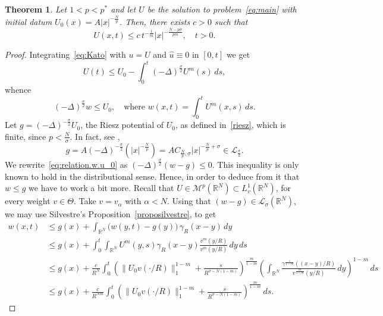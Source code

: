 \documentclass[leqno,12pt]{amsart}
\newtheorem{theorem}{Theorem}[section]
\theoremstyle{definition}
\theoremstyle{remark}
\numberwithin{equation}{section}
\begin{document}
\begin{theorem}\label{thm global bound}
    Let $1<p<p^*$ and let $U$ be the solution to problem~\eqref{eq:main} with initial datum $U_0(x)=A|x|^{-\frac Np}$. Then, there exists $c>0$ such that
    \begin{equation}\label{U:estimate}
        U(x,t)\le c\,t^{-\frac 1 m}|x|^{-\frac{N-p\sigma}{pm}},\quad t>0.
    \end{equation}
\end{theorem}

\begin{proof}
Integrating~\eqref{eq:Kato} with $u=U$ and $\hat u\equiv0$ in $[0,t]$ we get 
\[
    U(t)\le U_0-\int_0^t (-\Delta)^{\frac\sigma2}U^m(s)\,ds,
\]
whence
\begin{equation}\label{eq:relation.w.u_0}
    (-\Delta)^{\frac\sigma2}w\leq U_0,\quad \text{where }w(x,t)=\int_{0}^{t}U^{m}(x,s)\,ds.
\end{equation}
Let $g=(-\Delta)^{-\frac\sigma2}U_0$, the Riesz potential of $U_0$, as defined in~\eqref{riesz}, which is finite, since $p<\frac{N}{\sigma}$. In fact,
see \cite{lieb-loss},
\begin{equation}\label{rieszradial}
    g=A(-\Delta)^{-\frac{\sigma}{2}}\left(|x|^{-\frac{N}{p}}\right)=AC_{\frac{N}{p},\sigma}|x|^{-\frac{N}{p}+\sigma}\in \mathcal{L}_{\frac\sigma2}.
\end{equation} 
We rewrite~\eqref{eq:relation.w.u_0} as  $(-\Delta)^{\frac\sigma2}(w-g)\leq 0$. This inequality is only known to hold in the distributional sense. Hence, in order to deduce from it that $w\le g$ we have to work a bit more. Recall that $U\in \mathcal{M}^p(\mathbb{R}^N)\subset L_v^1(\mathbb{R}^N)$, for every weight $v\in\Theta$. Take $v=v_\alpha$ with $\alpha<N$. 
Using that $(w-g)\in \mathcal{L}_{\sigma}(\mathbb{R}^N)$, we may use Silvestre's Proposition~\ref{proposilvestre}, to get
\begin{align*}
    w(x,t) &\leq g(x) + \int_{\mathbb{R}^N} \big( w(y,t) - g(y)\big)\,\gamma_R(x-y)\,dy \\
    &\leq g(x) + \int_0^t \int_{\mathbb{R}^N} U^m(y,s)\gamma_R(x-y)\frac{v^m(y/R)}{v^m(y/R)}\,dy\,ds
    \\ &\leq g(x) + \frac{c}{R^N}\int_0^t 
    \left( \|U_0 v(\cdot/R)\|_{1}^{1-m} + \frac{s}{R^{\sigma-N(1-m)}} \right)^{\tfrac{m}{1-m}}
    \left( \int_{\mathbb{R}^N} \frac{\gamma^{\tfrac{1}{1-m}}((x-y)/R)}{v^{\tfrac{m}{1-m}}(y/R)}\,dy \right)^{1-m}\,ds\\
    &\leq g(x) + \frac{c}{R^{Nm}}\int_0^t 
    \left( \|U_0 v(\cdot/R)\|_{1}^{1-m} + \frac{s}{R^{\sigma-N(1-m)}} \right)^{\tfrac{m}{1-m}}\,ds.

\end{align*}
\end{proof}
\end{document}
